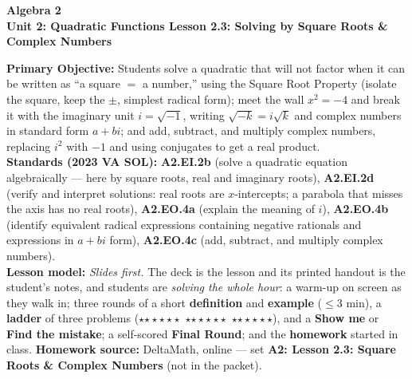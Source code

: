 \documentclass[10pt]{article}
\newcommand{\CourseName}{Algebra 2}
\newcommand{\UnitNumberName}{Unit 2: Quadratic Functions \quad}
\newcommand{\LessonNumberName}{Lesson 2.3: Solving by Square Roots \& Complex Numbers}
\newcommand{\rung}[1]{{\color{goldacc}\ifcase#1\or$\star$\or$\star\star$\or$\star\star\star$\fi}}
\begin{document}
\begin{center}
    {\Large\bfseries \CourseName \\
    {\small\bfseries \UnitNumberName \LessonNumberName}}
\end{center}

\begin{tcolorbox}[colback=forestbg, colframe=forest, boxrule=0.9pt, arc=2mm,
    left=2mm, right=2mm, top=1.5mm, bottom=1.5mm]
    \textbf{Primary Objective:} Students solve a quadratic that will not factor when it can be
    written as ``a square $=$ a number,'' using the Square Root Property (isolate the square,
    keep the $\pm$, simplest radical form); meet the wall $x^2=-4$ and break it with the
    imaginary unit $i=\sqrt{-1}$, writing $\sqrt{-k}=i\sqrt k$ and complex numbers in standard
    form $a+bi$; and add, subtract, and multiply complex numbers, replacing $i^2$ with $-1$ and
    using conjugates to get a real product.
    \\[2pt]
    \textbf{Standards (2023 VA SOL):} \textbf{A2.EI.2b} (solve a quadratic equation
    algebraically --- here by square roots, real and imaginary roots), \textbf{A2.EI.2d} (verify
    and interpret solutions: real roots are $x$-intercepts; a parabola that misses the axis has
    no real roots), \textbf{A2.EO.4a} (explain the meaning of $i$), \textbf{A2.EO.4b} (identify
    equivalent radical expressions containing negative rationals and expressions in $a+bi$
    form), \textbf{A2.EO.4c} (add, subtract, and multiply complex numbers).
    \\[2pt]
    \textbf{Lesson model:} \emph{Slides first.} The deck is the lesson and its printed handout is
    the student's notes, and students are \emph{solving the whole hour}: a warm-up on screen as
    they walk in; three rounds of a short \textbf{definition} and \textbf{example} ($\le$3 min),
    a \textbf{ladder} of three problems (\rung1\ \rung2\ \rung3), and a \textbf{Show me} or
    \textbf{Find the mistake}; a self-scored \textbf{Final Round}; and the \textbf{homework}
    started in class. \textbf{Homework source:} DeltaMath, online --- set
    \textbf{A2: Lesson 2.3: Square Roots \& Complex Numbers} (not in the packet).
\end{tcolorbox}
\end{document}
